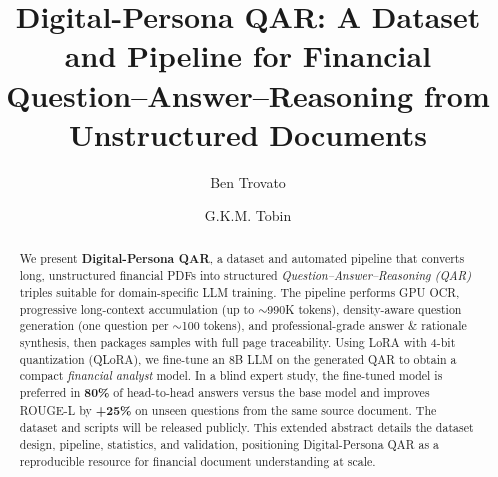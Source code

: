 \documentclass[sigconf,authordraft,anonymous]{acmart}
\begin{document}
\title{Digital-Persona QAR: A Dataset and Pipeline for Financial Question--Answer--Reasoning from Unstructured Documents}

\author{Ben Trovato}
\author{G.K.M. Tobin}
\authornotemark[1]

\renewcommand{\shortauthors}{Trovato et al.}

\begin{abstract}
    We present \textbf{Digital-Persona QAR}, a dataset and automated pipeline that converts long, unstructured financial PDFs into structured \emph{Question--Answer--Reasoning (QAR)} triples suitable for domain-specific LLM training. The pipeline performs GPU OCR, progressive long-context accumulation (up to $\sim$990K tokens), density-aware question generation (one question per $\sim$100 tokens), and professional-grade answer \& rationale synthesis, then packages samples with full page traceability. Using LoRA with 4-bit quantization (QLoRA), we fine-tune an 8B LLM on the generated QAR to obtain a compact \emph{financial analyst} model. In a blind expert study, the fine-tuned model is preferred in \textbf{80\%} of head-to-head answers versus the base model and improves ROUGE-L by \textbf{+25\%} on unseen questions from the same source document. The dataset and scripts will be released publicly. This extended abstract details the dataset design, pipeline, statistics, and validation, positioning Digital-Persona QAR as a reproducible resource for financial document understanding at scale.
\end{abstract}
\end{document}
